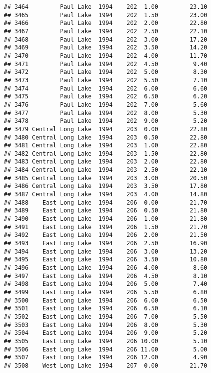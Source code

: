 \documentclass[
]{article}
\begin{document}
\begin{verbatim}
## 3464         Paul Lake  1994    202  1.00         23.10
## 3465         Paul Lake  1994    202  1.50         23.00
## 3466         Paul Lake  1994    202  2.00         22.80
## 3467         Paul Lake  1994    202  2.50         22.10
## 3468         Paul Lake  1994    202  3.00         17.20
## 3469         Paul Lake  1994    202  3.50         14.20
## 3470         Paul Lake  1994    202  4.00         11.70
## 3471         Paul Lake  1994    202  4.50          9.40
## 3472         Paul Lake  1994    202  5.00          8.30
## 3473         Paul Lake  1994    202  5.50          7.10
## 3474         Paul Lake  1994    202  6.00          6.60
## 3475         Paul Lake  1994    202  6.50          6.20
## 3476         Paul Lake  1994    202  7.00          5.60
## 3477         Paul Lake  1994    202  8.00          5.30
## 3478         Paul Lake  1994    202  9.00          5.20
## 3479 Central Long Lake  1994    203  0.00         22.80
## 3480 Central Long Lake  1994    203  0.50         22.80
## 3481 Central Long Lake  1994    203  1.00         22.80
## 3482 Central Long Lake  1994    203  1.50         22.80
## 3483 Central Long Lake  1994    203  2.00         22.80
## 3484 Central Long Lake  1994    203  2.50         22.10
## 3485 Central Long Lake  1994    203  3.00         20.50
## 3486 Central Long Lake  1994    203  3.50         17.80
## 3487 Central Long Lake  1994    203  4.00         14.80
## 3488    East Long Lake  1994    206  0.00         21.70
## 3489    East Long Lake  1994    206  0.50         21.80
## 3490    East Long Lake  1994    206  1.00         21.80
## 3491    East Long Lake  1994    206  1.50         21.70
## 3492    East Long Lake  1994    206  2.00         21.50
## 3493    East Long Lake  1994    206  2.50         16.90
## 3494    East Long Lake  1994    206  3.00         13.20
## 3495    East Long Lake  1994    206  3.50         10.80
## 3496    East Long Lake  1994    206  4.00          8.60
## 3497    East Long Lake  1994    206  4.50          8.10
## 3498    East Long Lake  1994    206  5.00          7.40
## 3499    East Long Lake  1994    206  5.50          6.80
## 3500    East Long Lake  1994    206  6.00          6.50
## 3501    East Long Lake  1994    206  6.50          6.10
## 3502    East Long Lake  1994    206  7.00          5.50
## 3503    East Long Lake  1994    206  8.00          5.30
## 3504    East Long Lake  1994    206  9.00          5.20
## 3505    East Long Lake  1994    206 10.00          5.10
## 3506    East Long Lake  1994    206 11.00          5.00
## 3507    East Long Lake  1994    206 12.00          4.90
## 3508    West Long Lake  1994    207  0.00         21.70

\end{verbatim}
\end{document}
